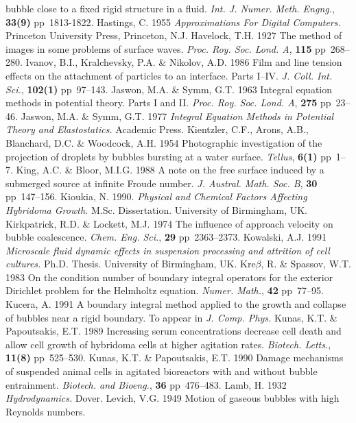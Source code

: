 bubble close to a fixed rigid structure in a fluid.
{\sl Int. J. Numer. Meth. Engng.}, {\bf 33(9)} pp~1813-1822.
\vskip 8pt
Hastings, C. 1955 {\sl Approximations For Digital Computers.} Princeton 
University Press, Princeton, N.J.
\vskip 8pt
Havelock, T.H. 1927 The method of images in some problems of 
surface waves. {\sl Proc. Roy. Soc. Lond. A}, {\bf 115} pp~268--280.
\vskip 8pt
Ivanov, B.I., Kralchevsky, P.A. \& Nikolov, A.D. 1986 Film 
and line tension effects
on the attachment of particles to an interface. Parts I--IV. 
{\sl J. Coll. Int. Sci.}, {\bf 102(1)} pp~97--143.
\vskip 8pt
Jaswon, M.A. \& Symm, G.T. 1963 Integral equation methods in potential theory.
Parts I and II. {\sl Proc. Roy. Soc. Lond. A}, {\bf 275} pp~23--46.
\vskip 8pt
Jaswon, M.A. \& Symm, G.T. 1977 {\sl Integral Equation Methods in Potential
Theory and Elastostatics.} Academic Press.
\vskip 8pt
Kientzler, C.F., Arons, A.B., Blanchard, D.C. \& Woodcock, A.H. 1954
Photographic investigation of the projection of droplets by bubbles 
bursting at a water surface. {\sl Tellus}, {\bf 6(1)} pp~1--7.
\vskip 8pt
King, A.C. \& Bloor, M.I.G. 1988 A note on the free surface 
induced by a submerged source at infinite Froude number. {\sl J. 
Austral. Math. Soc. B}, {\bf 30} pp~147--156.
\vskip 8pt
Kioukia, N. 1990. {\sl Physical and Chemical Factors Affecting Hybridoma
Growth.} M.Sc. Dissertation. University of Birmingham, UK.
\vskip 8pt
Kirkpatrick, R.D. \& Lockett, M.J. 1974 The influence of 
approach velocity on bubble
coalescence. {\sl Chem. Eng. Sci.}, {\bf 29} pp~2363--2373.
\vskip 8pt
Kowalski, A.J. 1991 {\sl Microscale fluid dynamic effects in suspension processing
and attrition of cell cultures.} Ph.D. Thesis. University of Birmingham, UK.
\vskip 8pt 
Kre$\beta$, R. \& Spassov, W.T. 1983 On the condition number of
boundary integral operators for the exterior Dirichlet problem
for the Helmholtz equation. {\sl Numer. Math.}, {\bf 42} pp~77--95.
\vskip 8pt
Kucera, A. 1991 A boundary integral method applied to the growth and collapse
of bubbles near a rigid boundary. To appear in {\sl J. Comp. Phys.}
\vskip 8pt
Kunas, K.T. \& Papoutsakis, E.T. 1989 Increasing serum concentrations
decrease cell death and allow cell growth of hybridoma cells at higher
agitation rates. {\sl Biotech. Letts.}, {\bf 11(8)} pp~525--530.
\vskip 8pt
Kunas, K.T. \& Papoutsakis, E.T. 1990 Damage mechanisms of suspended animal
cells in agitated bioreactors with and without bubble entrainment.
{\sl Biotech. and Bioeng.}, {\bf 36} pp~476--483.
\vskip 8pt
Lamb, H. 1932 {\sl Hydrodynamics.} Dover.
\vskip 8pt
Levich, V.G. 1949 Motion of gaseous bubbles with high Reynolds numbers.
